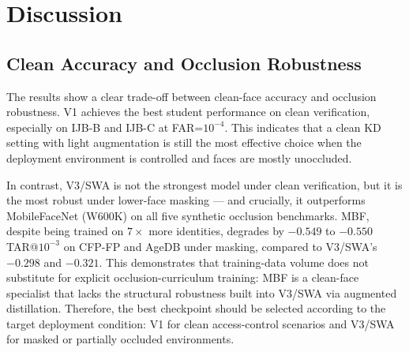 \begin{table}[h]
\centering
\caption{Ablation on lower-face occlusion. Values show TAR drop; smaller absolute drop is better.}
\label{tab:ablation_occlusion}
\end{table}

\section{Discussion}

\subsection{Clean Accuracy and Occlusion Robustness}

The results show a clear trade-off between clean-face accuracy and occlusion robustness. V1 achieves the best student performance on clean verification, especially on IJB-B and IJB-C at FAR=$10^{-4}$. This indicates that a clean KD setting with light augmentation is still the most effective choice when the deployment environment is controlled and faces are mostly unoccluded\cite{ijbb,ijbc}.

In contrast, V3/SWA is not the strongest model under clean verification, but it is the most robust under lower-face masking — and crucially, it outperforms MobileFaceNet (W600K) on all five synthetic occlusion benchmarks. MBF, despite being trained on $7\times$ more identities, degrades by $-0.549$ to $-0.550$ TAR@$10^{-3}$ on CFP-FP and AgeDB under masking, compared to V3/SWA's $-0.298$ and $-0.321$. This demonstrates that training-data volume does not substitute for explicit occlusion-curriculum training: MBF is a clean-face specialist that lacks the structural robustness built into V3/SWA via augmented distillation. Therefore, the best checkpoint should be selected according to the target deployment condition: V1 for clean access-control scenarios and V3/SWA for masked or partially occluded environments\cite{izmailov2019averagingweightsleadswider}.

